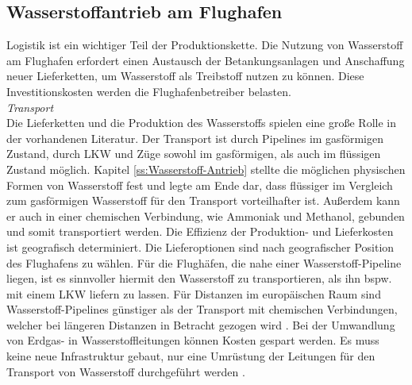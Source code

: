 
\subsection{Wasserstoffantrieb am Flughafen}
Logistik ist ein wichtiger Teil der Produktionskette. 
Die Nutzung von Wasserstoff am Flughafen erfordert einen Austausch der 
Betankungsanlagen und Anschaffung neuer Lieferketten, 
um Wasserstoff als Treibstoff nutzen zu können. 
Diese Investitionskosten werden die Flughafenbetreiber belasten.\\
\textit{Transport}\\
Die Lieferketten und die Produktion des Wasserstoffs spielen 
eine große Rolle in der vorhandenen Literatur.
Der Transport ist durch Pipelines im gasförmigen Zustand, 
durch LKW und Züge sowohl im gasförmigen, als auch im flüssigen Zustand möglich. 
Kapitel \ref{ss:Wasserstoff-Antrieb} stellte die möglichen physischen Formen 
von Wasserstoff fest und legte am Ende dar, 
dass flüssiger im Vergleich zum gasförmigen 
Wasserstoff für den Transport vorteilhafter ist. 
Außerdem kann er auch in einer chemischen Verbindung, 
wie Ammoniak und Methanol, gebunden und somit transportiert werden.
%
%
%
% 
Die Effizienz der Produktion- und Lieferkosten ist geografisch determiniert. 
Die Lieferoptionen sind nach geografischer Position des Flughafens zu wählen. 
Für die Flughäfen, die nahe einer Wasserstoff-Pipeline liegen, ist es sinnvoller
hiermit den Wasserstoff zu transportieren, als ihn bspw. mit einem LKW liefern zu lassen.
%
Für Distanzen im europäischen Raum sind Wasserstoff-Pipelines
günstiger als der Transport mit chemischen Verbindungen, 
welcher bei längeren Distanzen in Betracht gezogen wird \cite{undertaking2022strategic}. 
Bei der Umwandlung von Erdgas- in Wasserstoffleitungen können Kosten gespart werden. 
Es muss keine neue Infrastruktur gebaut, nur eine Umrüstung der 
Leitungen für den Transport von Wasserstoff durchgeführt werden \cite{undertaking2022strategic}.

